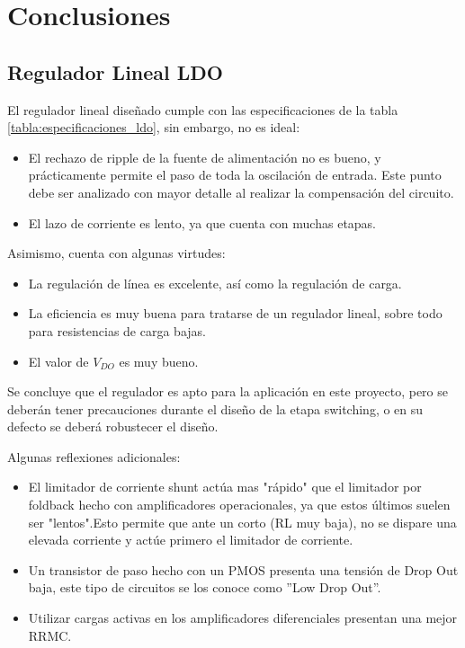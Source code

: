 
\section{Conclusiones}

\subsection{Regulador Lineal LDO}

El regulador lineal diseñado cumple con las especificaciones de la tabla \ref{tabla:especificaciones_ldo}, sin embargo, no es ideal:

\begin{itemize}
	\item El rechazo de ripple de la fuente de alimentación no es bueno, y prácticamente permite el paso de toda la oscilación de entrada. Este punto debe ser analizado con mayor detalle al realizar la compensación del circuito.
	\item El lazo de corriente es lento, ya que cuenta con muchas etapas.
\end{itemize}

Asimismo, cuenta con algunas virtudes:
\begin{itemize}
	\item La regulación de línea es excelente, así como la regulación de carga.
	\item La eficiencia es muy buena para tratarse de un regulador lineal, sobre todo para resistencias de carga bajas.
	\item El valor de $V_{DO}$ es muy bueno.
\end{itemize}

Se concluye que el regulador es apto para la aplicación en este proyecto, pero se deberán tener precauciones durante el diseño de la etapa switching, o en su defecto se deberá robustecer el diseño.

Algunas reflexiones adicionales:
\begin{itemize}
    \item El limitador de corriente shunt actúa mas "rápido" que el limitador por foldback hecho con amplificadores operacionales, ya que estos últimos suelen ser "lentos".Esto permite que ante un corto (RL muy baja), no se dispare una elevada corriente y actúe primero el limitador de corriente.
    \item Un transistor de paso hecho con un PMOS presenta una tensión de Drop Out baja, este tipo de circuitos se los conoce como ''Low Drop Out''.
    \item Utilizar cargas activas en los amplificadores diferenciales presentan una mejor RRMC.
\end{itemize}

